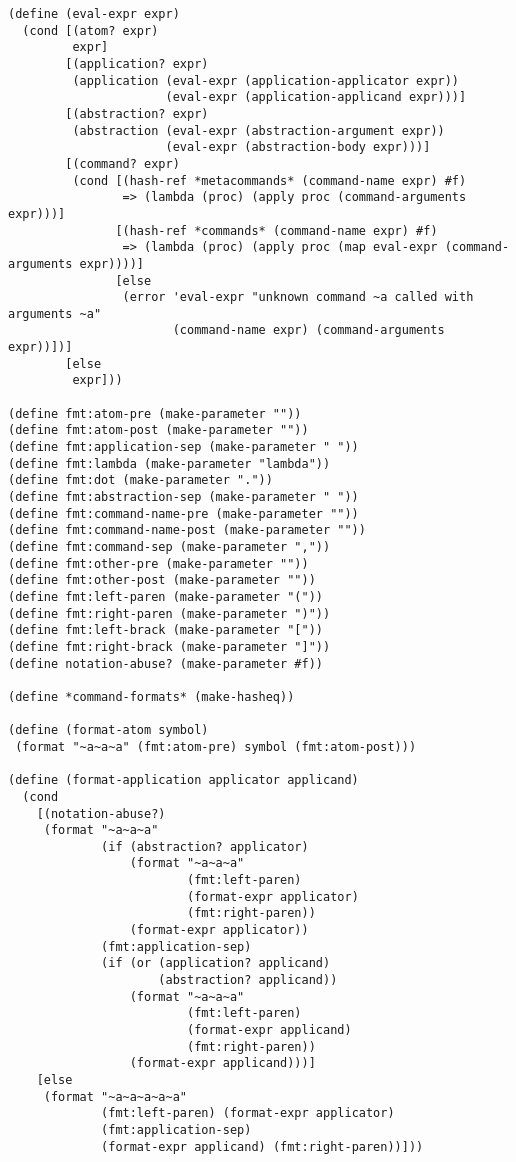 \begin{lstlisting}[language=racket]
(define (eval-expr expr)
  (cond [(atom? expr)
         expr]
        [(application? expr)
         (application (eval-expr (application-applicator expr))
                      (eval-expr (application-applicand expr)))]
        [(abstraction? expr)
         (abstraction (eval-expr (abstraction-argument expr))
                      (eval-expr (abstraction-body expr)))]
        [(command? expr)
         (cond [(hash-ref *metacommands* (command-name expr) #f)
                => (lambda (proc) (apply proc (command-arguments expr)))]
               [(hash-ref *commands* (command-name expr) #f)
                => (lambda (proc) (apply proc (map eval-expr (command-arguments expr))))]
               [else
                (error 'eval-expr "unknown command ~a called with arguments ~a"
                       (command-name expr) (command-arguments expr))])]
        [else
         expr]))

(define fmt:atom-pre (make-parameter ""))
(define fmt:atom-post (make-parameter ""))
(define fmt:application-sep (make-parameter " "))
(define fmt:lambda (make-parameter "lambda"))
(define fmt:dot (make-parameter "."))
(define fmt:abstraction-sep (make-parameter " "))
(define fmt:command-name-pre (make-parameter ""))
(define fmt:command-name-post (make-parameter ""))
(define fmt:command-sep (make-parameter ","))
(define fmt:other-pre (make-parameter ""))
(define fmt:other-post (make-parameter ""))
(define fmt:left-paren (make-parameter "("))
(define fmt:right-paren (make-parameter ")"))
(define fmt:left-brack (make-parameter "["))
(define fmt:right-brack (make-parameter "]"))
(define notation-abuse? (make-parameter #f))

(define *command-formats* (make-hasheq))

(define (format-atom symbol)
 (format "~a~a~a" (fmt:atom-pre) symbol (fmt:atom-post)))

(define (format-application applicator applicand)
  (cond
    [(notation-abuse?)
     (format "~a~a~a"
             (if (abstraction? applicator)
                 (format "~a~a~a"
                         (fmt:left-paren)
                         (format-expr applicator)
                         (fmt:right-paren))
                 (format-expr applicator))
             (fmt:application-sep)
             (if (or (application? applicand)
                     (abstraction? applicand))
                 (format "~a~a~a"
                         (fmt:left-paren)
                         (format-expr applicand)
                         (fmt:right-paren))
                 (format-expr applicand)))]
    [else
     (format "~a~a~a~a~a"
             (fmt:left-paren) (format-expr applicator)
             (fmt:application-sep)
             (format-expr applicand) (fmt:right-paren))]))


\end{lstlisting}
